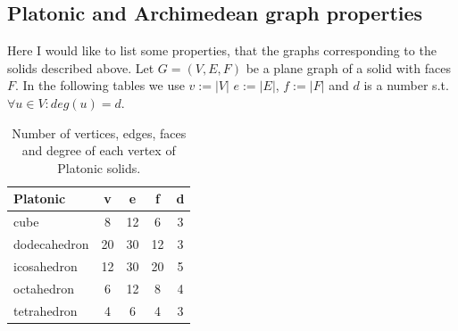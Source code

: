 
\begin{highlight}
\section*{Platonic and Archimedean graph properties}

Here I would like to list some properties, that the graphs corresponding to the solids described above. Let $G=(V,E,F)$ be a plane graph of a solid with faces $F$. In the following tables we use $v := |V|$ $e := |E|$, $f := |F|$ and $d$ is a number s.t. $\forall u \in V : deg(u) = d$.

\vspace{5pt}

\begin{table}[H]
\centering
\caption{Number of vertices, edges, faces and degree of each vertex of Platonic solids.}
\vspace{5pt}
\label{tab:platonic-basic-props}
\begin{tabular}{|l|c|c|c|c|}
\hline
Platonic & v & e & f & d \\
\hline\hline
cube & 8 & 12 & 6 & 3 \\
\hline
dodecahedron & 20 & 30 & 12 & 3 \\
\hline
icosahedron & 12 & 30 & 20 & 5 \\
\hline
octahedron & 6 & 12 & 8 & 4 \\
\hline
tetrahedron & 4 & 6 & 4 & 3 \\
\hline
\end{tabular}
\end{table}



\end{highlight}
